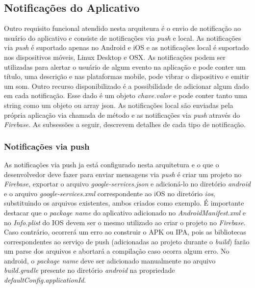 \subsection{Notificações do Aplicativo}
Outro requisito funcional atendido nesta arquiteura é o envio de notificação ao usuário do aplicativo e consiste de notificações via \textit{push} e local. As notificações via \textit{push} é suportado apenas no Android e iOS e as notificações local é suportado nos dispositivos móveis, Linux Desktop e OSX. As notificações podem ser utilizadas para alertar o usuário de algum evento na aplicação e pode conter um título, uma descrição e nas plataformas mobile, pode vibrar o dispositivo e emitir um som. Outro recurso disponibilizado é a possibilidade de adicionar algum dado em cada notificação. Esse dado é um objeto \textit{chave.valor} e pode conter tanto uma string como um objeto ou array json. As notificações local são enviadas pela própria aplicação via chamada de método e as notificações via \textit{push} através do \textit{Firebase}. As subsessões a seguir, descrevem detalhes de cada tipo de notificação.


\subsubsection{Notificações via push}
As notificações via push ja está configurado nesta arquitetura e o que o desenvolvedor deve fazer para enviar mensagens via \textit{push} é criar um projeto no \textit{Firebase}, exportar o arquivo \textit{google-services.json} e adicioná-lo no diretório \textit{android} e o arquivo \textit{google-services.xml} correspondente ao iOS no diretório \textit{ios}, substituindo os arquivos existentes, ambos criados como exemplo. É importante destacar que o \textit{package name} do aplicativo adicionado no \textit{AndroidManifest.xml} e no \textit{Info.plist} do IOS devem ser o mesmo utilizado ao criar o projeto no \textit{Firebase}. Caso contrário, ocorrerá um erro ao construir o APK ou IPA, pois as bibliotecas correspondentes ao serviço de push (adicionadas ao projeto durante o \textit{build}) farão um parse dos arquivos e abortará a compilação caso ocorra algum erro. No android, o \textit{package name} deve ser adicionado manualmente no arquivo \textit{build.gradle} presente no diretório \textit{android} na propriedade \textit{defaultConfig.applicationId}.\par

